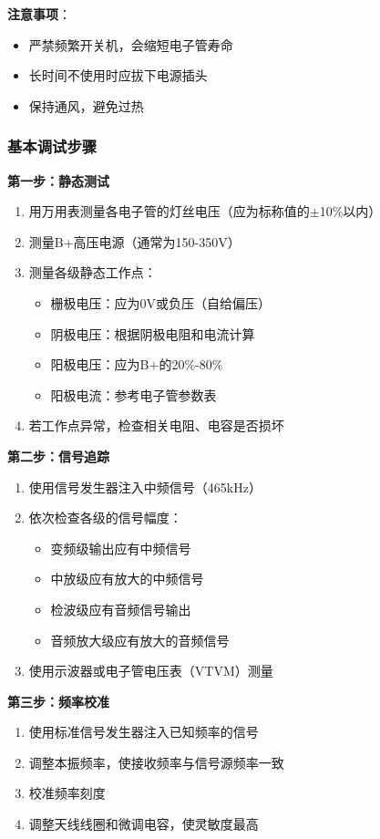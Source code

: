\textbf{注意事项}：
\begin{itemize}
    \item 严禁频繁开关机，会缩短电子管寿命
    \item 长时间不使用时应拔下电源插头
    \item 保持通风，避免过热
\end{itemize}

\subsubsection{基本调试步骤}
\label{sec:tube_radio_debug}

\textbf{第一步：静态测试}
\begin{enumerate}
    \item 用万用表测量各电子管的灯丝电压（应为标称值的$\pm$10\%以内）
    \item 测量B+高压电源（通常为150-350V）
    \item 测量各级静态工作点：
    \begin{itemize}
        \item 栅极电压：应为0V或负压（自给偏压）
        \item 阴极电压：根据阴极电阻和电流计算
        \item 阳极电压：应为B+的20\%-80\%
        \item 阳极电流：参考电子管参数表
    \end{itemize}
    \item 若工作点异常，检查相关电阻、电容是否损坏
\end{enumerate}

\textbf{第二步：信号追踪}
\begin{enumerate}
    \item 使用信号发生器注入中频信号（465kHz）
    \item 依次检查各级的信号幅度：
    \begin{itemize}
        \item 变频级输出应有中频信号
        \item 中放级应有放大的中频信号
        \item 检波级应有音频信号输出
        \item 音频放大级应有放大的音频信号
    \end{itemize}
    \item 使用示波器或电子管电压表（VTVM）测量
\end{enumerate}

\textbf{第三步：频率校准}
\begin{enumerate}
    \item 使用标准信号发生器注入已知频率的信号
    \item 调整本振频率，使接收频率与信号源频率一致
    \item 校准频率刻度
    \item 调整天线线圈和微调电容，使灵敏度最高
\end{enumerate}

